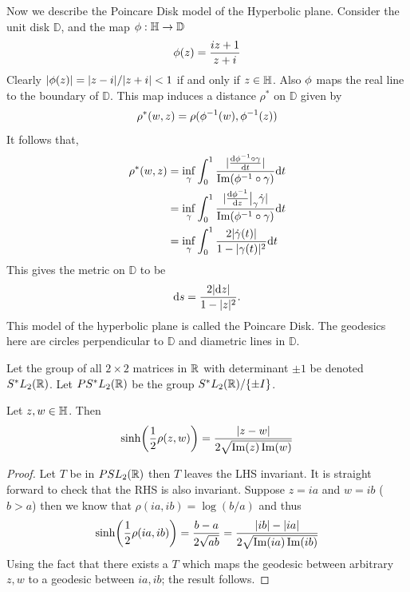 Now we describe the Poincare Disk model of the Hyperbolic plane. Consider the unit disk $\mathbb{D}$, and the map $\phi:\mathbb{H}\to \mathbb{D}$
\begin{align*}
  \phi(z) = \frac{iz+1}{z+i}
\end{align*}
Clearly $|\phi(z)| = |z-i|/|z+i| < 1$ if and only if $z\in \mathbb{H}$. Also $\phi$ maps the real line to the boundary of $ \mathbb{D}$. This map induces a distance $\rho^*$ on $ \mathbb{D}$ given by
\begin{align*}
  \rho^*(w,z) = \rho(\phi^{-1}(w), \phi^{-1}(z))
\end{align*}
It follows that,
\begin{align*}
  \rho^*(w,z) &= \inf_{\gamma} \int^1_0 \frac{|\dv{\phi^{-1}\circ \gamma}{t}|}{\Im(\phi^{-1}\circ \gamma)} \dd t\\
          &= \inf_{\gamma} \int^1_0 \frac{|\dv{\phi^{-1}}{z}\big|_\gamma \dot{\gamma}|}{\Im(\phi^{-1}\circ \gamma)} \dd t\\
          &= \inf_\gamma \int^1_0 \frac{2|\dot{\gamma}(t)|}{1- |\gamma(t)|^2} \dd t
\end{align*}
This gives the metric on $ \mathbb{D}$ to be
\begin{align*}
  \dd s = \frac{2|\dd z|}{1-|z|^2}.
\end{align*}
This model of the hyperbolic plane is called the Poincare Disk. The geodesics here are circles perpendicular to $ \mathbb{D}$ and diametric lines in $ \mathbb{D}$.
\begin{definition}
  Let the group of all $2\times 2$ matrices in $\mathbb{R}$ with determinant $\pm 1$ be denoted $S^*L_2(\mathbb{R})$. Let $PS^*L_2(\mathbb{R})$ be the group $S^*L_2(\mathbb{R})/\{\pm I\}$.
\end{definition}
\begin{proposition}
  Let $z,w\in \mathbb{H}$. Then
  \begin{align*}
    \sinh(\frac{1}{2} \rho(z,w)) = \frac{|z-w|}{2\sqrt{\Im(z)\Im(w)}}
  \end{align*}
\end{proposition}
\begin{proof}
  Let $T$ be in $PSL_2(\mathbb{R})$ then $T$ leaves the LHS invariant. It is straight forward to check that the RHS is also invariant. Suppose $z = ia$ and $w = ib$ ($b>a$) then we know that $\rho(ia,ib) = \log(b/a)$ and thus
  \begin{align*}
    \sinh(\frac{1}{2}\rho(ia,ib)) = \frac{b-a}{2\sqrt{ab}} = \frac{|ib| - |ia|}{2\sqrt{\Im(ia)\Im(ib)}}
  \end{align*}
  Using the fact that there exists a $T$ which maps the geodesic between arbitrary $z,w$ to a geodesic between $ia,ib$; the result follows.
\end{proof}
